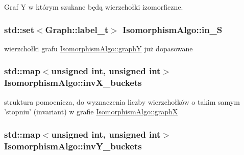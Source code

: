 Graf Y w którym szukane będą wierzchołki izomorficzne. 

\hypertarget{classIsomorphismAlgo_aad800e9783285450edbcdcb3b65c4133}{
\subsubsection[{in\-\_\-\-S}]{\setlength{\rightskip}{0pt plus 5cm}std\-::set$<${\bf Graph\-::label\-\_\-t}$>$ Isomorphism\-Algo\-::in\-\_\-\-S\hspace{0.3cm}{\ttfamily [private]}}}\label{classIsomorphismAlgo_aad800e9783285450edbcdcb3b65c4133}


wierzchołki grafu \hyperlink{classIsomorphismAlgo_a7656ae201d816e62edda60462cdb3a6e}{Isomorphism\-Algo\-::graph\-Y} już dopasowane 

\hypertarget{classIsomorphismAlgo_a3cf2ede3f4668ecb3ea8a005e190c9f4}{
\subsubsection[{inv\-X\-\_\-buckets}]{\setlength{\rightskip}{0pt plus 5cm}std\-::map$<$unsigned int, unsigned int$>$ Isomorphism\-Algo\-::inv\-X\-\_\-buckets\hspace{0.3cm}{\ttfamily [private]}}}\label{classIsomorphismAlgo_a3cf2ede3f4668ecb3ea8a005e190c9f4}


struktura pomocnicza, do wyznaczenia liczby wierzchołków o takim samym 'stopniu' (invariant) w grafie \hyperlink{classIsomorphismAlgo_a78bc7264b0a6a264b0343209b3ca3647}{Isomorphism\-Algo\-::graph\-X} 

\hypertarget{classIsomorphismAlgo_a8dcd9224b6360d3e5776307d8680f975}{
\subsubsection[{inv\-Y\-\_\-buckets}]{\setlength{\rightskip}{0pt plus 5cm}std\-::map$<$unsigned int, unsigned int$>$ Isomorphism\-Algo\-::inv\-Y\-\_\-buckets\hspace{0.3cm}{\ttfamily [private]}}}\label{classIsomorphismAlgo_a8dcd9224b6360d3e5776307d8680f975}


